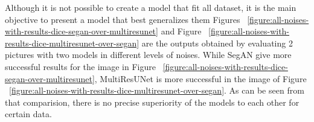     

    

    

    

    

    

    

    


    Although it is not possible to create a model that fit all dataset, it is the main objective to present a model that best generalizes them
    Figures ~\ref{figure:all-noises-with-results-dice-segan-over-multiresunet} and Figure ~\ref{figure:all-noises-with-results-dice-multiresunet-over-segan}
    are the outputs obtained by evaluating 2 pictures with two models in different levels of noises.
    While SegAN give more successful results for the image in Figure ~\ref{figure:all-noises-with-results-dice-segan-over-multiresunet},
    MultiResUNet is more successful in the image of Figure ~\ref{figure:all-noises-with-results-dice-multiresunet-over-segan}.
    As can be seen from that comparision, there is no precise superiority of the models to each other for certain data.

